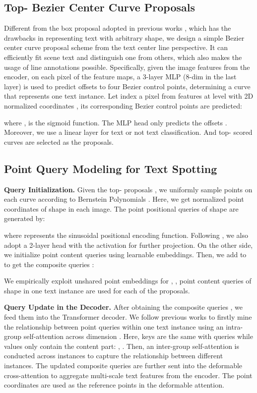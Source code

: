 \documentclass[10pt,twocolumn,letterpaper]{article}
\begin{document}
\subsection{Top- Bezier Center Curve Proposals}
\label{sec:top-k proposal}
Different from the box proposal adopted in previous works \cite{zhu2020deformable, zhang2022text, jia2022detrs, ye2022dptext, zhang2022dino}, which has the drawbacks in representing text with arbitrary shape, we design a simple Bezier center curve proposal scheme from the text center line perspective. It can efficiently fit scene text and distinguish one from others, which also makes the usage of line annotations possible. Specifically, given the image features from the encoder, on each pixel of the feature maps, a 3-layer MLP (8-dim in the last layer) is used to predict offsets to four Bezier control points, determining a curve that represents one text instance. Let  index a pixel from features at level  with 2D normalized coordinates , its corresponding Bezier control points  are predicted:

where ,  is the sigmoid function. The MLP head only predicts the offsets . Moreover, we use a linear layer for text or not text classification. And top- scored curves are selected as the proposals.

\subsection{Point Query Modeling for Text Spotting}
\noindent \textbf{Query Initialization.} Given the top- proposals , we uniformly sample  points on each curve according to Bernstein Polynomials \cite{lorentz2013bernstein}. Here, we get normalized point coordinates  of shape  in each image. The point positional queries  of shape  are generated by:

where  represents the sinusoidal positional encoding function. Following \cite{liu2022dab}, we also adopt a 2-layer  head with the  activation for further projection. On the other side, we initialize point content queries  using learnable embeddings. Then, we add  to  to get the composite queries :

We empirically exploit unshared point embeddings for , \ie,  point content queries of shape  in one text instance are used for each of the  proposals.

\noindent \textbf{Query Update in the Decoder.} After obtaining the composite queries , we feed them into the Transformer decoder. We follow previous works \cite{dong2021visual,zhang2022text,ye2022dptext} to firstly mine the relationship between point queries within one text instance using an intra-group self-attention across dimension . Here, keys are the same with queries while values only contain the content part: , . Then, an inter-group self-attention is conducted across  instances to capture the relationship between different instances. The updated composite queries are further sent into the deformable cross-attention to aggregate multi-scale text features from the encoder. The point coordinates  are used as the reference points in the deformable attention. 
\end{document}
